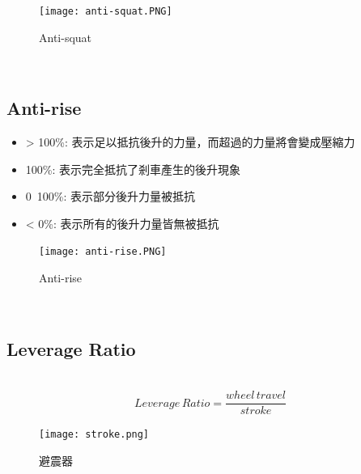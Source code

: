\documentclass[14pt,a4paper]{report}  %
\newcommand{\fourteen}{\fontsize{14pt}{\baselineskip}\selectfont}%
\begin{document}
{     \begin{figure}[hbt!]
       \centering
       \texttt{[image: anti-squat.PNG]}
       \caption{Anti-squat}
       \label{fig_anti-squat:scale}
    \end{figure}
       
       \hspace*{\fill} \\
       \subsection{Anti-rise}
       \fourteen {在剎車的時候因為力量轉移的關係導致後輪產生升起的情況，而Anti-rise即為抵抗此後升現象的能力。}
       \begin{itemize}
       \item > 100\%: 表示足以抵抗後升的力量，而超過的力量將會變成壓縮力
       \item 100\%: 表示完全抵抗了剎車產生的後升現象
       \item 0~100\%: 表示部分後升力量被抵抗
       \item < 0\%: 表示所有的後升力量皆無被抵抗
       \end{itemize}
	\begin{figure}[hbt!]
       \centering
       \texttt{[image: anti-rise.PNG]}
       \caption{Anti-rise}
       \label{fig_anti-rise:scale}
    \end{figure}
       
       
       \hspace*{\fill} \\
       \subsection{Leverage Ratio}
       \fourteen {Leverage ratio是避震器壓縮量和後輪行程的比值，當較大的槓桿比率會對避震器產生較大的衝擊，而在騎乘時對於地形變化的感受度較不敏感，相反地較小的槓桿比率對於地形的敏感度較高。其計算方式如下所示。}
       \hspace*{\fill} \\
       \begin{equation}
       Leverage\, Ratio = \frac{wheel\,travel}{stroke}
       \end{equation}

       
       \begin{figure}[hbt!]
        \centering
        \texttt{[image: stroke.png]}
        \caption{避震器}
        \label{fig_stroke:scale}
    	\end{figure}
       
}
\end{document}
